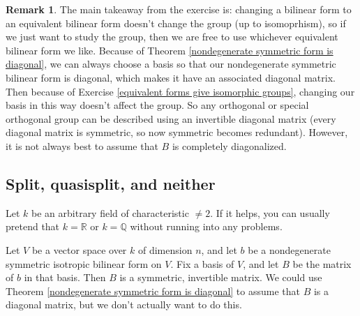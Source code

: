 \documentclass[12pt]{article}
\theoremstyle{definition}
\newtheorem{remark}[theorem]{Remark}
\numberwithin{theorem}{subsection}
\newcommand{\Q}{\mathbb{Q}}
\newcommand{\R}{\mathbb{R}}
\begin{document}
\begin{remark}
The main takeaway from the exercise is: changing a bilinear form to an equivalent bilinear form doesn't change the group (up to isomoprhism), so if we just want to study the group, then we are free to use whichever equivalent bilinear form we like. Because of Theorem \ref{nondegenerate symmetric form is diagonal}, we can always choose a basis so that our nondegenerate symmetric bilinear form is diagonal, which makes it have an associated diagonal matrix. Then because of Exercise \ref{equivalent forms give isomorphic groups}, changing our basis in this way doesn't affect the group. So any orthogonal or special orthogonal group can be described using an invertible diagonal matrix (every diagonal matrix is symmetric, so now symmetric becomes redundant). However, it is not always best to assume that $B$ is completely diagonalized.
\end{remark}

\subsection{Split, quasisplit, and neither}

Let $k$ be an arbitrary field of characteristic $\neq 2$. If it helps, you can usually pretend that $k = \R$ or $k = \Q$ without running into any problems. 

Let $V$ be a vector space over $k$ of dimension $n$, and let $b$ be a nondegenerate symmetric isotropic bilinear form on $V$. Fix a basis of $V$, and let $B$ be the matrix of $b$ in that basis. Then $B$ is a symmetric, invertible matrix. We could use Theorem \ref{nondegenerate symmetric form is diagonal} to assume that $B$ is a diagonal matrix, but we don't actually want to do this.
\end{document}
